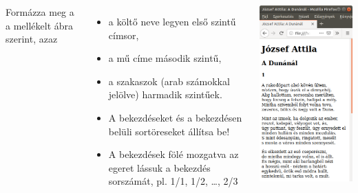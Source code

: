 \begin{frame}
  \begin{columns}[c]
      Formázza meg a  a mellékelt ábra szerint, azaz
      \begin{itemize}
        \item a költő neve legyen első szintű címsor, 
        \item a mű címe második szintű,
        \item a szakaszok (arab számokkal jelölve) harmadik szintűek.
        \item A bekezdéseket és a bekezdésen belüli sortöreseket állítsa be!
        \item A bekezdések fölé mozgatva az egeret lássuk a bekezdés sorszámát, pl. 1/1, 1/2, \dots, 2/3
      \end{itemize}
      \begin{center}
        \begin{exampleblock}{}
          \centering \includegraphics[scale=.2]{attila.png}
        \end{exampleblock}
      \end{center}
  \end{columns}
\end{frame}

